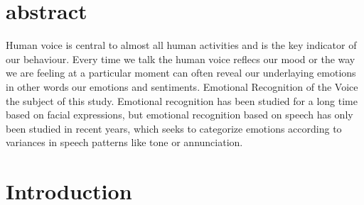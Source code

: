 \documentclass[acmsmall,nonacm,natbib=false]{acmart}
\begin{document}


\maketitle
\section{abstract}
Human voice is central to almost all human activities and is the key indicator of our behaviour. Every time we talk the human voice reflecs our mood or the way we are feeling at a particular moment can often reveal our underlaying emotions in other words our emotions and sentiments. Emotional Recognition of the Voice the subject of this study. Emotional recognition has been studied for a long time based on facial expressions, but emotional recognition based on speech has only been studied in recent years, which seeks to categorize emotions according to variances in speech patterns like tone or annunciation.
\section{Introduction}

\printbibliography

\end{document}

